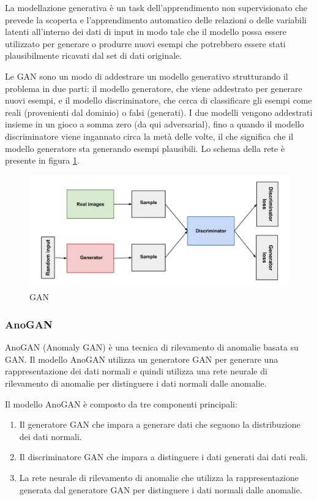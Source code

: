 La modellazione generativa è un task dell'apprendimento non supervisionato che prevede la scoperta e l'apprendimento automatico delle relazioni o delle variabili latenti all'interno dei dati di input in modo tale che il modello possa essere utilizzato per generare o produrre nuovi esempi che potrebbero essere stati plausibilmente ricavati dal set di dati originale.

Le GAN sono un modo di addestrare un modello generativo strutturando il problema in due parti: il modello generatore, che viene addestrato per generare nuovi esempi, e il modello discriminatore, che cerca di classificare gli esempi come reali (provenienti dal dominio) o falsi (generati). I due modelli vengono addestrati insieme in un gioco a somma zero (da qui adversarial), fino a quando il modello discriminatore viene ingannato circa la metà delle volte, il che significa che il modello generatore sta generando esempi plausibili. Lo schema della rete è presente in figura \ref{gan}.
\begin{figure}[t]
	\centering
	\includegraphics[width=12cm, scale=1]{images/gan}
	\caption{GAN}
	\label{gan}
\end{figure}

\subsubsection{AnoGAN}
AnoGAN (Anomaly GAN) \cite{schlegl2017unsupervised} è una tecnica di rilevamento di anomalie basata su GAN. Il modello AnoGAN utilizza un generatore GAN per generare una rappresentazione dei dati normali e quindi utilizza una rete neurale di rilevamento di anomalie per distinguere i dati normali dalle anomalie.

Il modello AnoGAN è composto da tre componenti principali:

\begin{enumerate}
\item Il generatore GAN che impara a generare dati che seguono la distribuzione dei dati normali.
\item Il discriminatore GAN che impara a distinguere i dati generati dai dati reali.
\item La rete neurale di rilevamento di anomalie che utilizza la rappresentazione generata dal generatore GAN per distinguere i dati normali dalle anomalie.
\end{enumerate}


